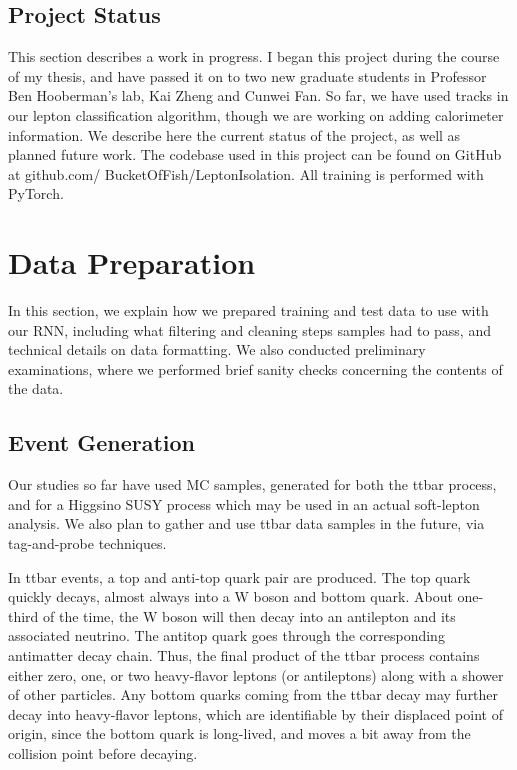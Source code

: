 \section{Project Status}

This section describes a work in progress. I began this project during the course of my thesis, and have passed it on to two new graduate students in Professor Ben Hooberman's lab, Kai Zheng and Cunwei Fan. So far, we have used tracks in our lepton classification algorithm, though we are working on adding calorimeter information. We describe here the current status of the project, as well as planned future work. The codebase used in this project can be found on GitHub at github.com/ BucketOfFish/LeptonIsolation. All training is performed with PyTorch.

\chapter{Data Preparation}

In this section, we explain how we prepared training and test data to use with our RNN, including what filtering and cleaning steps samples had to pass, and technical details on data formatting. We also conducted preliminary examinations, where we performed brief sanity checks concerning the contents of the data.

\section{Event Generation}

Our studies so far have used MC samples, generated for both the ttbar process, and for a Higgsino SUSY process which may be used in an actual soft-lepton analysis. We also plan to gather and use ttbar data samples in the future, via tag-and-probe techniques.

In ttbar events, a top and anti-top quark pair are produced. The top quark quickly decays, almost always into a W boson and bottom quark. About one-third of the time, the W boson will then decay into an antilepton and its associated neutrino. The antitop quark goes through the corresponding antimatter decay chain. Thus, the final product of the ttbar process contains either zero, one, or two heavy-flavor leptons (or antileptons) along with a shower of other particles. Any bottom quarks coming from the ttbar decay may further decay into heavy-flavor leptons, which are identifiable by their displaced point of origin, since the bottom quark is long-lived, and moves a bit away from the collision point before decaying.

